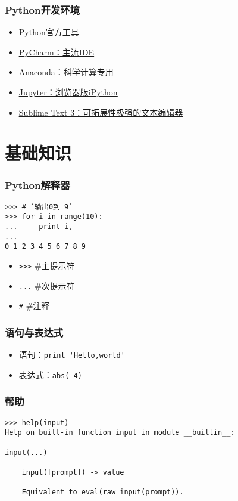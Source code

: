 \documentclass[13pt]{beamer}
\begin{document}
\begin{frame}
\frametitle{Python开发环境}
\begin{itemize}
\item \href{https://www.python.org}{\underline{Python官方工具}}
\item \href{http://www.jetbrains.com/pycharm/}{\underline{PyCharm：主流IDE}}
\item \href{https://www.continuum.io/downloads}{\underline{Anaconda：科学计算专用}}
\item \href{http://jupyter.org}{\underline{Jupyter：浏览器版iPython}}
\item \href{https://www.sublimetext.com/3}{\underline{Sublime Text 3：可拓展性极强的文本编辑器}}
\end{itemize}
\end{frame}

\section{基础知识}
\begin{frame}[containsverbatim]
\frametitle{Python解释器}
\begin{lstlisting}
>>> # `输出0到 9`
>>> for i in range(10):
...     print i,
...
0 1 2 3 4 5 6 7 8 9
\end{lstlisting}
\begin{itemize}
  \item \lstinline{>>>}     \#主提示符
  \item \lstinline{...}         \#次提示符
  \item \lstinline{#}         \#注释
\end{itemize}
\end{frame}

\begin{frame}[containsverbatim]
\frametitle{语句与表达式}
\begin{itemize}
  \item 语句：\lstinline{print 'Hello,world'}
  \item 表达式：\lstinline{abs(-4)}
\end{itemize}
\end{frame}

\begin{frame}[containsverbatim]
\frametitle{帮助}
\begin{lstlisting}
>>> help(input)
Help on built-in function input in module __builtin__:

input(...)

    input([prompt]) -> value
    
    Equivalent to eval(raw_input(prompt)).
    
\end{lstlisting}
\end{frame}
\end{document}
